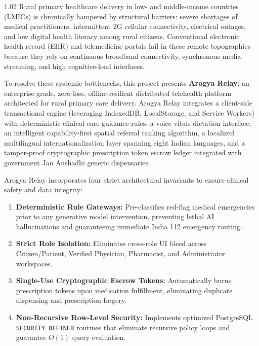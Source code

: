 \documentclass[12pt,a4paper,oneside]{report}
\begin{document}
\begin{spacing}{1.02}
Rural primary healthcare delivery in low- and middle-income countries (LMICs) is chronically hampered by structural barriers: severe shortages of medical practitioners, intermittent 2G cellular connectivity, electrical outages, and low digital health literacy among rural citizens. Conventional electronic health record (EHR) and telemedicine portals fail in these remote topographies because they rely on continuous broadband connectivity, synchronous media streaming, and high cognitive-load interfaces.

\vspace{0.08cm}
To resolve these systemic bottlenecks, this project presents \textbf{Arogya Relay}: an enterprise-grade, zero-loss, offline-resilient distributed telehealth platform architected for rural primary care delivery. Arogya Relay integrates a client-side transactional engine (leveraging IndexedDB, LocalStorage, and Service Workers) with deterministic clinical care guidance rules, a voice vitals dictation interface, an intelligent capability-first spatial referral ranking algorithm, a localized multilingual internationalization layer spanning eight Indian languages, and a tamper-proof cryptographic prescription token escrow ledger integrated with government Jan Aushadhi generic dispensaries.

\vspace{0.08cm}
Arogya Relay incorporates four strict architectural invariants to ensure clinical safety and data integrity:
\begin{enumerate}[label=\textbf{\arabic*.},itemsep=0pt,topsep=1pt,parsep=0pt,partopsep=0pt]
    \item \textbf{Deterministic Rule Gateways:} Pre-classifies red-flag medical emergencies prior to any generative model intervention, preventing lethal AI hallucinations and guaranteeing immediate India 112 emergency routing.
    \item \textbf{Strict Role Isolation:} Eliminates cross-role UI bleed across Citizen/Patient, Verified Physician, Pharmacist, and Administrator workspaces.
    \item \textbf{Single-Use Cryptographic Escrow Tokens:} Automatically burns prescription tokens upon medication fulfillment, eliminating duplicate dispensing and prescription forgery.
    \item \textbf{Non-Recursive Row-Level Security:} Implements optimized PostgreSQL \texttt{SECURITY DEFINER} routines that eliminate recursive policy loops and guarantee $O(1)$ query evaluation.
\end{enumerate}


\end{spacing}
\end{document}
